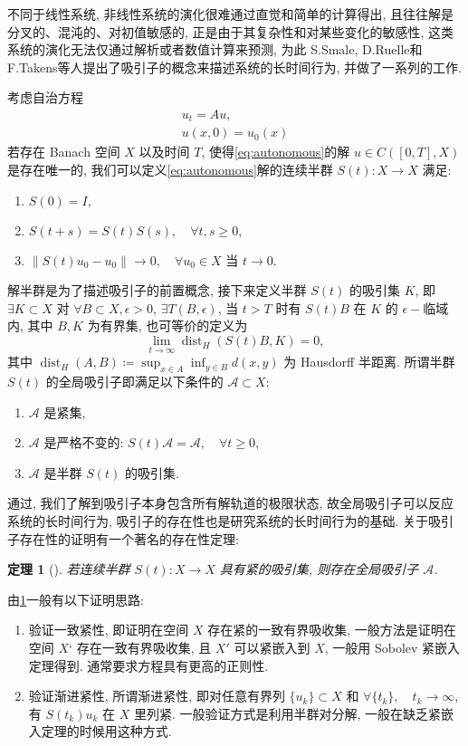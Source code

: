 \documentclass[twoside,longtitle]{LZUthesis}
\newtheorem{theorem}{定理}[chapter]
\theoremstyle{definition}
\numberwithin{equation}{chapter}
\newcommand*\norm[1]{\lVert#1\rVert}
\newcommand*\Brace[1]{\lbrace#1\rbrace}
\DeclareMathOperator{\dist}{dist}
\begin{document}
不同于线性系统, 非线性系统的演化很难通过直觉和简单的计算得出,
且往往解是分叉的、混沌的、对初值敏感的,
正是由于其复杂性和对某些变化的敏感性, 这类系统的演化无法仅通过解析或者数值计算来预测,
为此 S.Smale, D.Ruelle和F.Takens等人提出了吸引子的概念来描述系统的长时间行为,
并做了一系列的工作.

考虑自治方程
\begin{equation}\label{eq:autonomous}
	\begin{gathered}
		u_t = Au,\\
		u(x, 0) = u_0(x)
	\end{gathered}
\end{equation}
若存在 Banach 空间 $X$ 以及时间 $T$, 使得\cref{eq:autonomous}的解 $u \in C([0, T], X)$ 是存在唯一的,
我们可以定义\cref{eq:autonomous}解的连续半群 $S(t) \colon X \to X$ 满足:
\begin{enumerate}
	\item $S(0) = I,$
	\item $S(t + s) = S(t)S(s), \quad \forall t, s \geq 0,$
	\item $\norm{S(t)u_0 - u_0} \to 0, \quad\forall u_0 \in X$ 当 $t \to 0$.
\end{enumerate}
解半群是为了描述吸引子的前置概念, 接下来定义半群 $S(t)$ 的吸引集 $K$,
即 $\exists K \subset X$
对 $\forall B \subset X, \epsilon > 0$, $\exists T(B, \epsilon)$,
当 $t > T$ 时有 $S(t)B$ 在 $K$ 的 $\epsilon-$临域内,
其中 $B, K$ 为有界集, 也可等价的定义为
\begin{equation}
	\lim_{t \to \infty} \dist_H(S(t)B, K) = 0,
\end{equation}
其中 $\dist_H(A, B) \coloneqq \sup_{x \in A}\inf_{y \in B}d(x, y)$ 为 Hausdorff 半距离.
所谓半群 $S(t)$ 的全局吸引子即满足以下条件的 $\mathcal{A} \subset X$:
\begin{enumerate}
	\item $\mathcal{A}$ 是紧集,
	\item $\mathcal{A}$ 是严格不变的: $S(t)\mathcal{A} = \mathcal{A}, \quad\forall t \geq 0$,
	\item $\mathcal{A}$ 是半群 $S(t)$ 的吸引集.
\end{enumerate}
通过\citep{efendievAttractorsDegenerateParabolic2013b}, 我们了解到吸引子本身包含所有解轨道的极限状态,
故全局吸引子可以反应系统的长时间行为, 吸引子的存在性也是研究系统的长时间行为的基础.
关于吸引子存在性的证明有一个著名的存在性定理:
\begin{theorem}[\citep{efendievAttractorsDegenerateParabolic2013b}]\label{thm:attractorexist}
	若连续半群 $S(t): X \to X$ 具有紧的吸引集, 则存在全局吸引子 $\mathcal{A}$.
\end{theorem}
由\cref{thm:attractorexist}一般有以下证明思路:
\begin{enumerate}
	\item 验证一致紧性, 即证明在空间 $X$ 存在紧的一致有界吸收集,
	一般方法是证明在空间 $X‘$ 存在一致有界吸收集, 且 $X'$ 可以紧嵌入到 $X$,
	一般用 Sobolev 紧嵌入定理得到. 通常要求方程具有更高的正则性.
	\item 验证渐进紧性, 所谓渐进紧性, 即对任意有界列 $\Brace{u_k} \subset X$ 和
	$\forall \Brace{t_k}, \quad t_k \to \infty$, 有 $S(t_k)u_k$ 在 $X$ 里列紧.
	一般验证方式是利用半群对分解, 一般在缺乏紧嵌入定理的时候用这种方式.
\end{enumerate}
\end{document}
